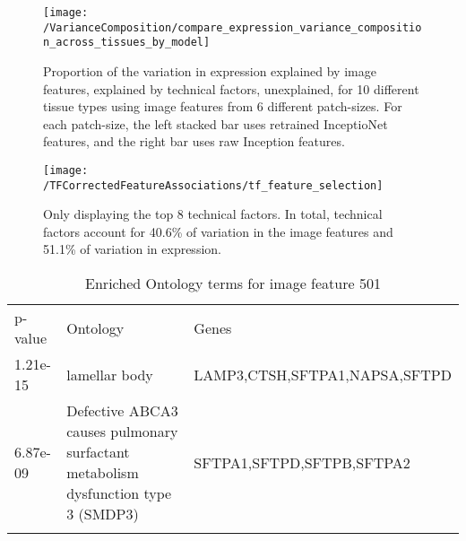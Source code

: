\documentclass{article}
\begin{document}
\begin{figure}[h]
  \centering
    \texttt{[image: /VarianceComposition/compare\_expression\_variance\_composition\_across\_tissues\_by\_model]} 
  \caption{Proportion of the variation in expression \textcolor{figgreen}{explained by image features}, \textcolor{figpurple}{explained by technical factors}, \textcolor{figorange}{unexplained}, for 10 different tissue types using image features from 6 different patch-sizes. For each patch-size, the left stacked bar uses retrained InceptioNet features, and the right bar uses raw Inception features.}
  \label{fig:variance_composition}
\end{figure}

\begin{figure}[h]
    \centering
      \texttt{[image: /TFCorrectedFeatureAssociations/tf\_feature\_selection]} 
        \caption{Only displaying the top 8 technical factors. In total, technical factors account for 40.6\% of variation in the image features and 51.1\% of variation in expression.}
        \label{fig:tf_feature_selection}
\end{figure}


\begin{table}[H]
\caption{Enriched Ontology terms for image feature 501}
\label{tab:image_feature_pcs_and_tfs}       %

\begin{tabular}{p{2cm}p{6cm}p{6cm}}
\hline\noalign{\smallskip}
p-value & Ontology & Genes  \\
1.21e-15 & lamellar body & LAMP3,CTSH,SFTPA1,NAPSA,SFTPD  \\
6.87e-09 & Defective ABCA3 causes pulmonary surfactant metabolism dysfunction type 3 (SMDP3) & SFTPA1,SFTPD,SFTPB,SFTPA2 \\


\noalign{\smallskip}\hline\noalign{\smallskip}
\end{tabular}
\end{table}
\end{document}
